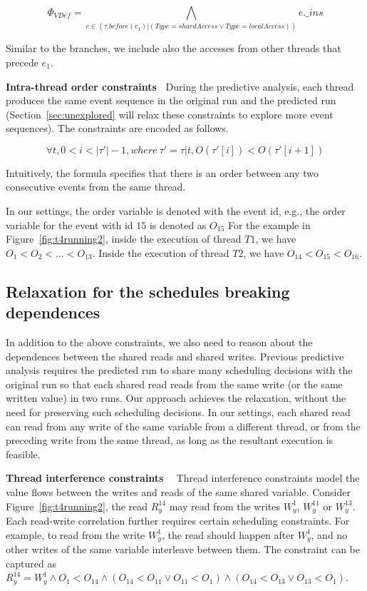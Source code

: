  $$
\Phi_{VDef}=\bigwedge_{e\in (\tau.before(e_1)|(Type=shardAccess\vee Type=localAccess))} e.\_ins 
$$

Similar to the branches, we include also the accesses from other threads that precede $e_1$.



{\bf Intra-thread order constraints\ } During the predictive analysis, each thread produces the same event sequence in the original run and the predicted run (Section~\ref{sec:unexplored} will relax these constraints to explore more event sequences).  
The constraints are encoded as follows. 

$$
\forall t,  0<i<|\tau'|-1, where\  \tau'=\tau|t, O(\tau'[i])<O(\tau'[i+1])
$$

  
Intuitively, the formula specifies that there is an order between any two consecutive events from the same thread. 

 In our settings, the order variable is denoted with the event id, e.g., the order variable for the event with id $15$ is denoted as $O_{15}$
For the example in Figure~\ref{fig:t4running2}, inside the execution of thread $T1$, we have $O_1<O_2 < \dots < O_{13}$. 
Inside the execution of thread $T2$, we have $O_{14}<O_{15}<O_{16}$.


\subsection{Relaxation for the schedules breaking dependences}
In addition to the above constraints, we also need to reason about the dependences between the shared reads and shared writes. 
 Previous predictive analysis requires the predicted run to share many scheduling decisions with the original run so that each shared read reads from the same write (or the same written value) in two runs. Our approach achieves the relaxation, without the need for preserving such scheduling decisions. In our settings, each shared read can read from any write of the same variable from a different thread, or from the preceding write from the same thread, as long as the resultant execution is feasible.
 

{\bf Thread interference constraints \ }  Thread interference constraints model the value flows between the writes and reads of the same shared variable. 
Consider Figure~\ref{fig:t4running2},  the read $R^{14}_y$ may read from the writes $W^1_y$, $W^{11}_y$ or $W^{13}_y$.
Each read-write correlation further requires certain scheduling constraints. For example, to read from the write $W^1_y$, the read should happen after $W^1_y$, and no other writes of the same variable interleave between them. The constraint can be captured as $R^{14}_y=W^1_y \wedge O_1<O_{14} \wedge (O_{14}<O_{11} \vee O_{11} < O_1) \wedge (O_{14}<O_{13} \vee O_{13}<O_{1})$.  

